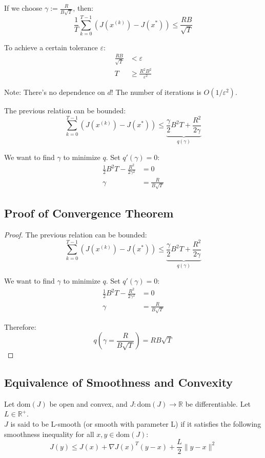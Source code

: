 \begin{theorem}
If we choose $\gamma := \frac{R}{B\sqrt{T}}$, then:
\[
\frac{1}{T}\sum_{k=0}^{T-1}(J(x^{(k)}) - J(x^*)) \leq \frac{RB}{\sqrt{T}}
\]
\end{theorem}

To achieve a certain tolerance $\varepsilon$:
\[
\begin{aligned}
\frac{RB}{\sqrt{T}} &< \varepsilon \\
T &\geq \frac{R^2B^2}{\varepsilon^2}
\end{aligned}
\]

Note: There's no dependence on $d$! The number of iterations is $O(1/\varepsilon^2)$.

The previous relation can be bounded:
\[
\sum_{k=0}^{T-1}(J(x^{(k)}) - J(x^*)) \leq \underbrace{\frac{\gamma}{2}B^2T + \frac{R^2}{2\gamma}}_{q(\gamma)}
\]

We want to find $\gamma$ to minimize $q$. Set $q'(\gamma) = 0$:
\[
\begin{aligned}
\frac{1}{2}B^2T - \frac{R^2}{2\gamma^2} &= 0 \\
\gamma &= \frac{R}{B\sqrt{T}}
\end{aligned}
\]

\subsection*{Proof of Convergence Theorem}
\begin{proof}
The previous relation can be bounded:
\[
\sum_{k=0}^{T-1}(J(x^{(k)}) - J(x^*)) \leq \underbrace{\frac{\gamma}{2}B^2T + \frac{R^2}{2\gamma}}_{q(\gamma)}
\]

We want to find $\gamma$ to minimize $q$. Set $q'(\gamma) = 0$:
\[
\begin{aligned}
\frac{1}{2}B^2T - \frac{R^2}{2\gamma^2} &= 0 \\
\gamma &= \frac{R}{B\sqrt{T}}
\end{aligned}
\]

Therefore:
\[
q\left(\gamma = \frac{R}{B\sqrt{T}}\right) = RB\sqrt{T}
\]
\end{proof}

\subsection*{Equivalence of Smoothness and Convexity}


Let $\text{dom}(J)$ be open and convex, and $J: \text{dom}(J) \to \mathbb{R}$ be differentiable. Let $L \in \mathbb{R}^+$. \\ 
$J$ is said to be L-smooth (or smooth with parameter L) if it satisfies the following smoothness inequality for all $x, y \in \text{dom}(J)$:
$$J(y) \leq J(x) + \nabla J(x)^T(y-x) + \frac{L}{2}\|y-x\|^2$$

